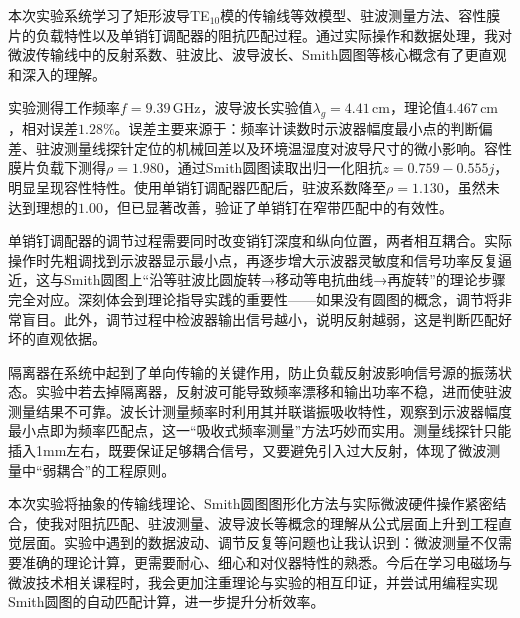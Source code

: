 \documentclass[12pt,a4paper]{article}
\begin{document}
本次实验系统学习了矩形波导TE$_{10}$模的传输线等效模型、驻波测量方法、容性膜片的负载特性以及单销钉调配器的阻抗匹配过程。通过实际操作和数据处理，我对微波传输线中的反射系数、驻波比、波导波长、Smith圆图等核心概念有了更直观和深入的理解。

实验测得工作频率$f=9.39\,\text{GHz}$，波导波长实验值$\lambda_g=4.41\,\text{cm}$，理论值$4.467\,\text{cm}$，相对误差$1.28\%$。误差主要来源于：频率计读数时示波器幅度最小点的判断偏差、驻波测量线探针定位的机械回差以及环境温湿度对波导尺寸的微小影响。容性膜片负载下测得$\rho=1.980$，通过Smith圆图读取出归一化阻抗$z=0.759-0.555j$，明显呈现容性特性。使用单销钉调配器匹配后，驻波系数降至$\rho=1.130$，虽然未达到理想的$1.00$，但已显著改善，验证了单销钉在窄带匹配中的有效性。


单销钉调配器的调节过程需要同时改变销钉深度和纵向位置，两者相互耦合。实际操作时先粗调找到示波器显示最小点，再逐步增大示波器灵敏度和信号功率反复逼近，这与Smith圆图上“沿等驻波比圆旋转→移动等电抗曲线→再旋转”的理论步骤完全对应。深刻体会到理论指导实践的重要性——如果没有圆图的概念，调节将非常盲目。此外，调节过程中检波器输出信号越小，说明反射越弱，这是判断匹配好坏的直观依据。

隔离器在系统中起到了单向传输的关键作用，防止负载反射波影响信号源的振荡状态。实验中若去掉隔离器，反射波可能导致频率漂移和输出功率不稳，进而使驻波测量结果不可靠。波长计测量频率时利用其并联谐振吸收特性，观察到示波器幅度最小点即为频率匹配点，这一“吸收式频率测量”方法巧妙而实用。测量线探针只能插入1mm左右，既要保证足够耦合信号，又要避免引入过大反射，体现了微波测量中“弱耦合”的工程原则。

本次实验将抽象的传输线理论、Smith圆图图形化方法与实际微波硬件操作紧密结合，使我对阻抗匹配、驻波测量、波导波长等概念的理解从公式层面上升到工程直觉层面。实验中遇到的数据波动、调节反复等问题也让我认识到：微波测量不仅需要准确的理论计算，更需要耐心、细心和对仪器特性的熟悉。今后在学习电磁场与微波技术相关课程时，我会更加注重理论与实验的相互印证，并尝试用编程实现Smith圆图的自动匹配计算，进一步提升分析效率。
\end{document}

